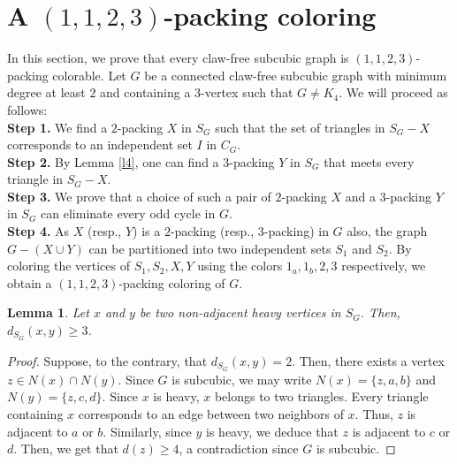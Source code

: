 \documentclass[12pt, oneside]{scrartcl}
\newtheorem{lemma}{Lemma}%
\begin{document}
\section{A $(1,1,2,3)$-packing coloring}
In this section, we prove that every claw-free subcubic graph is $(1,1,2,3)$-packing colorable. Let $G$ be a connected claw-free subcubic graph with minimum degree at least $2$ and containing a $3$-vertex such that $G\neq K_4$. We will proceed as follows:\\
\textbf{Step 1.} We find a $2$-packing $X$ in $S_G$ such that the set of triangles in $S_G-X$ corresponds to an independent set $I$ in $C_G$.\\
\textbf{Step 2.} By Lemma \ref{l4}, one can find a $3$-packing $Y$ in $S_G$ that meets every triangle in $S_G-X$.\\
\textbf{Step 3.} We prove that a choice of such a pair of $2$-packing $X$ and a $3$-packing $Y$ in $S_G$ can eliminate every odd cycle in $G$.\\
\textbf{Step 4.} As $X$ (resp., $Y$) is a $2$-packing (resp., $3$-packing) in $G$ also, the graph $G-(X\cup Y)$ can be partitioned into two independent sets $S_1$ and $S_2$. By coloring the vertices of $S_1,S_2,X,Y$ using the colors $1_a,1_b,2,3$ respectively, we obtain a $(1,1,2,3)$-packing coloring of $G$.

\begin{lemma}\label{l5}
Let $x$ and $y$ be two non-adjacent heavy vertices in $S_G$. Then, $d_{S_G}(x,y)\geq 3$.
\end{lemma}
\begin{proof}
Suppose, to the contrary, that $d_{S_G}(x,y)=2$. Then, there exists a vertex $z\in N(x) \cap N(y)$. Since $G$ is subcubic, we may write $N(x)=\{z,a,b\}$ and $N(y)=\{z,c,d\}$. Since $x$ is heavy, $x$ belongs to two triangles. Every triangle containing $x$ corresponds to an edge between two neighbors of $x$. Thus, $z$ is adjacent to $a$ or $b$. Similarly, since $y$ is heavy, we deduce that $z$ is adjacent to $c$ or $d$. Then, we get that $d(z)\ge 4$, a contradiction since $G$ is subcubic.    
\end{proof}
\end{document}
